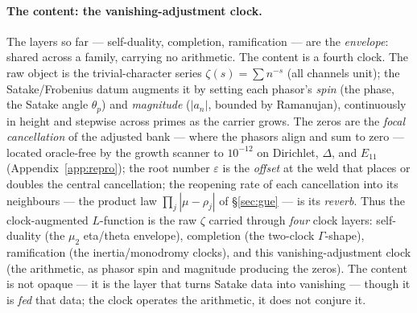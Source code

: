 \documentclass[11pt]{article}
\theoremstyle{definition}
\begin{document}
\paragraph{The content: the vanishing-adjustment clock.} The layers so far --- self-duality, completion,
ramification --- are the \emph{envelope}: shared across a family, carrying no arithmetic. The content is a
fourth clock. The raw object is the trivial-character series $\zeta(s)=\sum n^{-s}$ (all channels unit);
the Satake/Frobenius datum augments it by setting each phasor's \emph{spin} (the phase, the Satake angle
$\theta_p$) and \emph{magnitude} ($|a_n|$, bounded by Ramanujan), continuously in height and stepwise
across primes as the carrier grows. The zeros are the \emph{focal cancellation} of the adjusted bank ---
where the phasors align and sum to zero --- located oracle-free by the growth scanner to $10^{-12}$ on
Dirichlet, $\Delta$, and $E_{11}$ (Appendix~\ref{app:repro}); the root number $\varepsilon$ is the
\emph{offset} at the weld that places or doubles the central cancellation; the reopening rate of each
cancellation into its neighbours --- the product law $\prod_j|\mu-\rho_j|$ of \S\ref{sec:gue} --- is its
\emph{reverb}. Thus the clock-augmented $L$-function is the raw $\zeta$ carried through \emph{four} clock
layers: self-duality (the $\mu_2$ eta/theta envelope), completion (the two-clock $\Gamma$-shape),
ramification (the inertia/monodromy clocks), and this vanishing-adjustment clock (the arithmetic, as
phasor spin and magnitude producing the zeros). The content is not opaque --- it is the layer that turns
Satake data into vanishing --- though it is \emph{fed} that data; the clock operates the arithmetic, it
does not conjure it.
\end{document}
